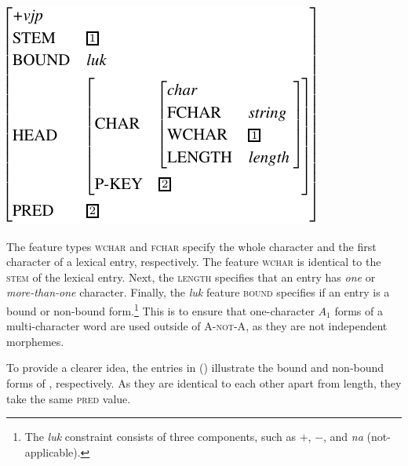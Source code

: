 \documentclass[11pt]{article}
\def\anota{\textsc{A-not-A}}
\def\aone{$A_1$}
\newcommand{\tdl}[1]{\textit{#1}}
\begin{document}
{\small 
\ex{}
\vspace{-10pt}
\newline
\includegraphics[scale=.8]{pdf/vjp.pdf}
\xe}
\vspace{-20pt}

The feature types \textsc{wchar} and \textsc{fchar} specify the whole
character and the first character of a lexical entry, respectively. The
feature \textsc{wchar} is identical to the \textsc{stem} of the lexical
entry. Next, the \textsc{length} specifies that an entry has
\textit{one} or \textit{more-than-one} character. Finally, the \tdl{luk}
feature \textsc{bound} specifies if an entry is a bound or non-bound
form.\footnote{The \tdl{luk} constraint consists of three components,
such as \ensuremath{+}, \ensuremath{-}, and \tdl{na}
(not-applicable).} This is to ensure that one-character {\aone}  forms
of a multi-character word are used outside of \anota, as they are not
independent morphemes. 


To provide a clearer idea, the entries in ()
illustrate the bound and non-bound forms of ,
respectively. As they are identical to each other apart from length,
they take the same \textsc{pred} value.
\end{document}
